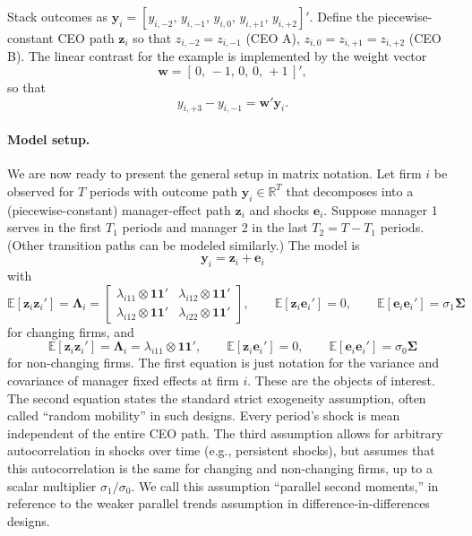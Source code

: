 \documentclass[11pt,a4paper]{article}
\begin{document}
Stack outcomes as $\mathbf y_i=[y_{i,-2},\,y_{i,-1},\,y_{i,0},\,y_{i,+1},\,y_{i,+2}]'$. Define the piecewise-constant CEO path $\mathbf z_i$ so that $z_{i,-2}=z_{i,-1}$ (CEO A), $z_{i,0} = z_{i,+1}=z_{i,+2}$ (CEO B). The linear contrast for the example is implemented by the weight vector
\[
  \mathbf w = [\,0,\,-1,\,0,\,0,\,+1\,]',
\]
so that 
$$
y_{i,+3} - y_{i,-1} = \mathbf w' \mathbf y_i.
$$

\paragraph{Model setup.} We are now ready to present the general setup in matrix notation. Let firm $i$ be observed for $T$ periods with outcome path $\mathbf y_i\in\mathbb R^T$ that decomposes into a (piecewise-constant) manager-effect path $\mathbf z_i$ and shocks $\mathbf e_i$. Suppose manager 1 serves in the first $T_1$ periods and manager 2 in the last $T_2=T-T_1$ periods. (Other transition paths can be modeled similarly.) The model is
\begin{equation}
\mathbf y_i = \mathbf z_i + \mathbf e_i
\end{equation}
with 
\begin{equation}
\mathbb E[\mathbf z_i\mathbf z_i']= \mathbf \Lambda_i=
\begin{bmatrix}
  \lambda_{i11}\otimes \mathbf{11}' & \lambda_{i12}\otimes \mathbf{11}'\\
  \lambda_{i12}\otimes \mathbf{11}' & \lambda_{i22}\otimes \mathbf{11}'
\end{bmatrix},
\qquad \mathbb E[\mathbf z_i\mathbf e_i']=0,
\qquad \mathbb E[\mathbf e_i\mathbf e_i']=\sigma_1\mathbf\Sigma
\end{equation}
for changing firms, and 
\begin{equation}
\mathbb E[\mathbf z_i\mathbf z_i']= \mathbf \Lambda_i=
  \lambda_{i11}\otimes \mathbf{11}',
\qquad \mathbb E[\mathbf z_i\mathbf e_i']=0,
\qquad \mathbb E[\mathbf e_i\mathbf e_i']=\sigma_0\mathbf\Sigma
\end{equation}
for non-changing firms. The first equation is just notation for the variance and covariance of manager fixed effects at firm $i$. These are the objects of interest. The second equation states the standard strict exogeneity assumption, often called ``random mobility'' in such designs. Every period's shock is mean independent of the entire CEO path. The third assumption allows for arbitrary autocorrelation in shocks over time (e.g., persistent shocks), but assumes that this autocorrelation is the same for changing and non-changing firms, up to a scalar multiplier $\sigma_1/\sigma_0$. We call this assumption ``parallel second moments,'' in reference to the weaker parallel trends assumption in difference-in-differences designs.
\end{document}
